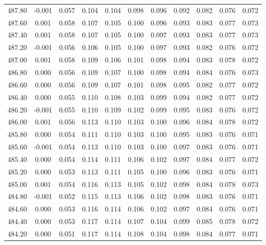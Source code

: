 \begin{longtable}{cccccccccc}
    487.80 & -0.001 &  0.057 &  0.104 &  0.104 &  0.098 &  0.096 &  0.092 &  0.082 &  0.076 &  0.072 \\
    487.60 &  0.001 &  0.058 &  0.107 &  0.105 &  0.100 &  0.096 &  0.093 &  0.083 &  0.077 &  0.073 \\
    487.40 &  0.001 &  0.058 &  0.107 &  0.105 &  0.100 &  0.097 &  0.093 &  0.083 &  0.077 &  0.073 \\
    487.20 & -0.001 &  0.056 &  0.106 &  0.105 &  0.100 &  0.097 &  0.093 &  0.082 &  0.076 &  0.072 \\
    487.00 &  0.001 &  0.058 &  0.109 &  0.106 &  0.101 &  0.098 &  0.094 &  0.083 &  0.078 &  0.072 \\
    486.80 &  0.000 &  0.056 &  0.109 &  0.107 &  0.100 &  0.098 &  0.094 &  0.084 &  0.076 &  0.073 \\
    486.60 &  0.000 &  0.056 &  0.109 &  0.107 &  0.101 &  0.098 &  0.095 &  0.082 &  0.077 &  0.072 \\
    486.40 &  0.000 &  0.055 &  0.110 &  0.108 &  0.103 &  0.099 &  0.094 &  0.082 &  0.077 &  0.072 \\
    486.20 & -0.001 &  0.055 &  0.110 &  0.109 &  0.102 &  0.099 &  0.095 &  0.083 &  0.076 &  0.072 \\
    486.00 &  0.001 &  0.056 &  0.113 &  0.110 &  0.103 &  0.100 &  0.096 &  0.084 &  0.078 &  0.072 \\
    485.80 &  0.000 &  0.054 &  0.111 &  0.110 &  0.103 &  0.100 &  0.095 &  0.083 &  0.076 &  0.071 \\
    485.60 & -0.001 &  0.054 &  0.113 &  0.110 &  0.103 &  0.100 &  0.097 &  0.083 &  0.076 &  0.071 \\
    485.40 &  0.000 &  0.054 &  0.114 &  0.111 &  0.106 &  0.102 &  0.097 &  0.084 &  0.077 &  0.072 \\
    485.20 &  0.000 &  0.053 &  0.113 &  0.111 &  0.105 &  0.100 &  0.096 &  0.083 &  0.076 &  0.071 \\
    485.00 &  0.001 &  0.054 &  0.116 &  0.113 &  0.105 &  0.102 &  0.098 &  0.084 &  0.078 &  0.073 \\
    484.80 & -0.001 &  0.052 &  0.115 &  0.113 &  0.106 &  0.102 &  0.098 &  0.083 &  0.076 &  0.071 \\
    484.60 &  0.000 &  0.053 &  0.116 &  0.114 &  0.106 &  0.102 &  0.097 &  0.084 &  0.076 &  0.071 \\
    484.40 &  0.000 &  0.053 &  0.117 &  0.114 &  0.107 &  0.104 &  0.099 &  0.085 &  0.078 &  0.072 \\
    484.20 &  0.000 &  0.051 &  0.117 &  0.114 &  0.108 &  0.104 &  0.098 &  0.084 &  0.077 &  0.071 \\

\end{longtable}
